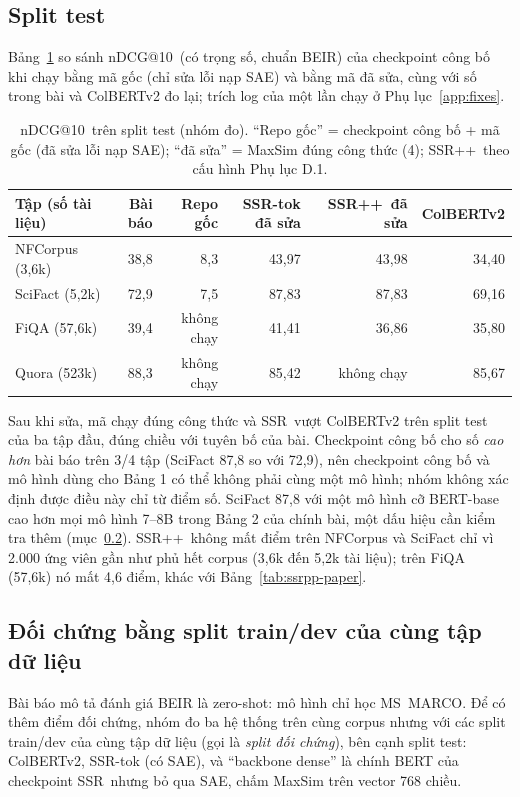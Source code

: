 \documentclass[a4paper,13pt]{extreport}
\makeatletter
\theoremstyle{plain}
\newcommand{\ssr}{SSR}
\newcommand{\ssrpp}{SSR++}
\newcommand{\ndcg}{nDCG@10}
\makeatother
\begin{document}
\subsection{Split test}
\label{sec:test}
Bảng~\ref{tab:test} so sánh \ndcg\ (có trọng số, chuẩn BEIR) của checkpoint công bố khi chạy bằng mã gốc (chỉ sửa lỗi nạp SAE) và bằng mã đã sửa, cùng với số trong bài và ColBERTv2 đo lại; trích log của một lần chạy ở Phụ lục~\ref{app:fixes}.
\begin{table}[htbp]
\centering
\caption[\ndcg\ trên split test (nhóm đo)]{\ndcg\ trên split test (nhóm đo). ``Repo gốc'' = checkpoint công bố + mã gốc (đã sửa lỗi nạp SAE); ``đã sửa'' = MaxSim đúng công thức (4); \ssrpp\ theo cấu hình Phụ lục D.1.}
\label{tab:test}
\small
\begin{tabular}{lrrrrr}
\toprule
\textbf{Tập (số tài liệu)} & \textbf{Bài báo} & \textbf{Repo gốc} & \textbf{\ssr-tok đã sửa} & \textbf{\ssrpp\ đã sửa} & \textbf{ColBERTv2}\\
\midrule
NFCorpus (3,6k) & 38,8 & 8,3 & 43,97 & 43,98 & 34,40\\
SciFact (5,2k) & 72,9 & 7,5 & 87,83 & 87,83 & 69,16\\
FiQA (57,6k) & 39,4 & không chạy & 41,41 & 36,86 & 35,80\\
Quora (523k) & 88,3 & không chạy & 85,42 & không chạy & 85,67\\
\bottomrule
\end{tabular}
\end{table}

Sau khi sửa, mã chạy đúng công thức và \ssr\ vượt ColBERTv2 trên split test của ba tập đầu, đúng chiều với tuyên bố của bài. Checkpoint công bố cho số \emph{cao hơn} bài báo trên 3/4 tập (SciFact 87,8 so với 72,9), nên checkpoint công bố và mô hình dùng cho Bảng 1 có thể không phải cùng một mô hình; nhóm không xác định được điều này chỉ từ điểm số. SciFact 87,8 với một mô hình cỡ BERT-base cao hơn mọi mô hình 7--8B trong Bảng 2 của chính bài, một dấu hiệu cần kiểm tra thêm (mục~\ref{sec:split}). \ssrpp\ không mất điểm trên NFCorpus và SciFact chỉ vì 2.000 ứng viên gần như phủ hết corpus (3,6k đến 5,2k tài liệu); trên FiQA (57,6k) nó mất 4,6 điểm, khác với Bảng~\ref{tab:ssrpp-paper}.

\subsection{Đối chứng bằng split train/dev của cùng tập dữ liệu}
\label{sec:split}
Bài báo mô tả đánh giá BEIR là zero-shot: mô hình chỉ học MS~MARCO. Để có thêm điểm đối chứng, nhóm đo ba hệ thống trên cùng corpus nhưng với các split train/dev của cùng tập dữ liệu (gọi là \emph{split đối chứng}), bên cạnh split test: ColBERTv2, \ssr-tok (có SAE), và ``backbone dense'' là chính BERT của checkpoint \ssr\ nhưng bỏ qua SAE, chấm MaxSim trên vector 768 chiều.
\end{document}
